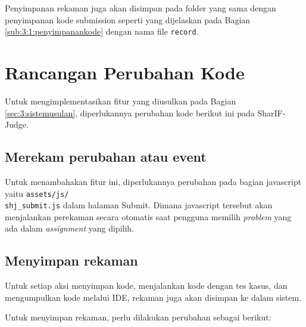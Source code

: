 Penyimpanan rekaman juga akan disimpan pada folder yang sama dengan penyimpanan kode submission seperti yang dijelaskan pada Bagian \ref{sub:3:1:penyimpanankode} dengan nama file \verb|record|.

\section{Rancangan Perubahan Kode}

Untuk mengimplementasikan fitur yang diusulkan pada Bagian \ref{sec:3:sistemusulan}, diperlukannya perubahan kode berikut ini pada SharIF-Judge.


\subsection{Merekam perubahan atau event}
\label{sub:4:3:merekam}

Untuk menambahakan fitur ini, diperlukannya perubahan pada bagian javascript yaitu \verb|assets/js/|\\\verb|shj_submit.js| dalam halaman Submit. Dimana javascript tersebut akan menjalankan perekaman secara otomatis saat pengguna memilih \textit{problem} yang ada dalam \textit{assignment} yang dipilih.

\subsection{Menyimpan rekaman}
\label{sub:4:3:menyimpanrekaman}

Untuk setiap aksi menyimpan kode, menjalankan kode dengan tes kasus, dan mengumpulkan kode melalui IDE, rekaman juga akan disimpan ke dalam sistem.

Untuk menyimpan rekaman, perlu dilakukan perubahan sebagai berikut:

